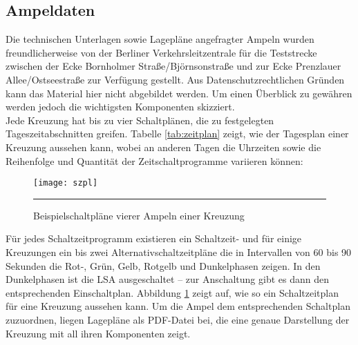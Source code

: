 \subsection{Ampeldaten}
Die technischen Unterlagen sowie Lagepläne angefragter Ampeln wurden freundlicherweise von der Berliner Verkehrsleitzentrale für die Teststrecke zwischen der Ecke Bornholmer Straße/Björnsonstraße und zur Ecke Prenzlauer Allee/Ostseestraße zur Verfügung gestellt. Aus Datenschutzrechtlichen Gründen kann das Material hier nicht abgebildet werden. Um einen Überblick zu gewähren werden jedoch die wichtigsten Komponenten skizziert.\\ 
Jede Kreuzung hat bis zu vier Schaltplänen, die zu festgelegten Tageszeitabschnitten greifen. Tabelle \ref{tab:zeitplan} zeigt, wie der Tagesplan einer Kreuzung aussehen kann, wobei an anderen Tagen die Uhrzeiten sowie die Reihenfolge und Quantität der Zeitschaltprogramme variieren können:
\begin{figure}[H]
\centering
	\begin{minipage}[b]{0.29\textwidth}	
		\label{tab:zeitplan}
	\end{minipage} \hfill
%
	\begin{minipage}[b]{0.6\textwidth}
		\texttt{[image: szpl]}
		\label{fig:plan}
	\end{minipage}
	\rule{35em}{0.5pt}
	\caption{Beispielschaltpläne vierer Ampeln einer Kreuzung}
	
\end{figure}
Für jedes Schaltzeitprogramm existieren ein Schaltzeit- und für einige Kreuzungen ein bis zwei Alternativschaltzeitpläne die in Intervallen von 60 bis 90 Sekunden die Rot-, Grün, Gelb, Rotgelb und Dunkelphasen zeigen. In den Dunkelphasen ist die \gls{LSA} ausgeschaltet -- zur Anschaltung gibt es dann den entsprechenden Einschaltplan. Abbildung \ref{fig:plan} zeigt auf, wie so ein Schaltzeitplan für eine Kreuzung aussehen kann. Um die Ampel dem entsprechenden Schaltplan zuzuordnen, liegen Lagepläne als \gls{PDF}-Datei bei, die eine genaue Darstellung der Kreuzung mit all ihren Komponenten zeigt. 

